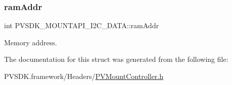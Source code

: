 \subsubsection{\texorpdfstring{ram\+Addr}{ramAddr}}
{\footnotesize\ttfamily int P\+V\+S\+D\+K\+\_\+\+M\+O\+U\+N\+T\+A\+P\+I\+\_\+\+I2\+C\+\_\+\+D\+A\+T\+A\+::ram\+Addr}



Memory address. 



The documentation for this struct was generated from the following file\+:\begin{DoxyCompactItemize}
\item 
P\+V\+S\+D\+K.\+framework/\+Headers/\hyperlink{_p_v_mount_controller_8h}{P\+V\+Mount\+Controller.\+h}\end{DoxyCompactItemize}
